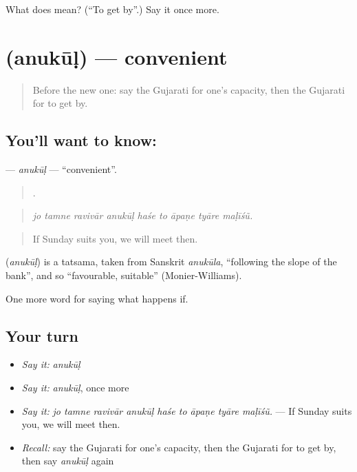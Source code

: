 \begin{tcolorbox}[breakable,colback=teal!4,colframe=teal!35!black,title={Before you move on}]
What does  mean? (\textquotedblleft{}To get by\textquotedblright{}.) Say it once more.
\end{tcolorbox}
\section[\texorpdfstring{\gu{અનુકૂળ} (anukūḷ)}{અનુકૂળ (anukūḷ)}]{ (anukūḷ) — convenient}

\label{lesson:GU-C532-anukul}



\begin{quote}
Before the new one: say the Gujarati for one's capacity, then the Gujarati for to get by.
\end{quote}

\subsection*{You'll want to know: }
\textbf{} — \emph{anukūḷ} — \textquotedblleft{}convenient\textquotedblright{}.

\begin{quote}
        .
\end{quote}

\begin{quote}
\emph{jo tamne ravivār anukūḷ haśe to āpaṇe tyāre maḷīśũ.}
\end{quote}

\begin{quote}
If Sunday suits you, we will meet then.
\end{quote}

\begin{cousinweb}
\textbf{} (\emph{anukūḷ}) is a tatsama, taken from Sanskrit \emph{anukūla}, \textquotedblleft{}following the slope of the bank\textquotedblright{}, and so \textquotedblleft{}favourable, suitable\textquotedblright{} (Monier-Williams).
\end{cousinweb}

\begin{grammarlens}[title={What you've built}]
One more word for saying what happens if.
\end{grammarlens}

\subsection*{Your turn}
\begin{itemize}
\raggedright
  \item \emph{Say it:} \emph{anukūḷ}
  \item \emph{Say it:} \emph{anukūḷ}, once more
  \item \emph{Say it:} \emph{jo tamne ravivār anukūḷ haśe to āpaṇe tyāre maḷīśũ.} — If Sunday suits you, we will meet then.
  \item \emph{Recall:} say the Gujarati for one's capacity, then the Gujarati for to get by, then say \emph{anukūḷ} again
\end{itemize}

